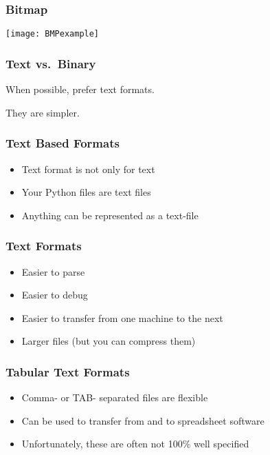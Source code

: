 \begin{frame}[fragile]
\frametitle{Bitmap}

\centering
\texttt{[image: BMPexample]}

\end{frame}

\begin{frame}[fragile]
\frametitle{Text vs.\ Binary}
When possible, prefer text formats.

They are simpler.
\end{frame}




\begin{frame}[fragile]
\frametitle{Text Based Formats}

\begin{itemize}
\item Text format is not only for text
\item Your Python files are text files
\item Anything can be represented as a text-file
\end{itemize}

\end{frame}

\begin{frame}[fragile]
\frametitle{Text Formats}

\begin{itemize}
\item Easier to parse
\item Easier to debug
\item Easier to transfer from one machine to the next
\item Larger files (but you can compress them)
\end{itemize}
\end{frame}

\begin{frame}[fragile]
\frametitle{Tabular Text Formats}

\begin{itemize}
\item Comma- or TAB- separated files are flexible
\item Can be used to transfer from and to spreadsheet software
\item Unfortunately, these are often not 100\% well specified
\end{itemize}
\end{frame}

